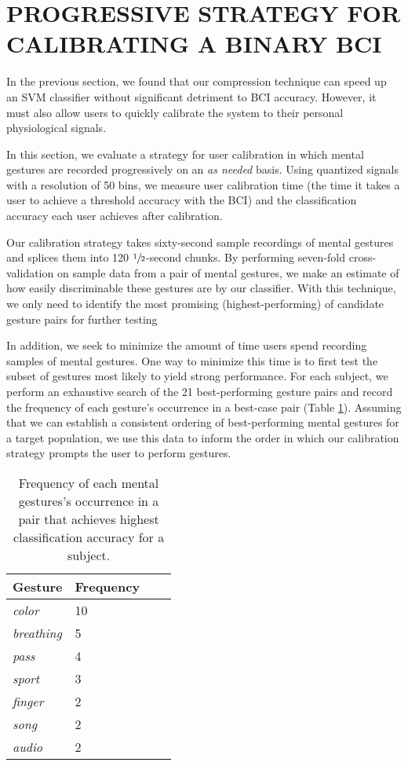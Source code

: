 \section{\uppercase{Progressive strategy for calibrating a binary BCI}}
\label{sec:calibration_eval}

\noindent In the previous section, we found that our compression technique can speed up an SVM classifier without significant detriment to BCI accuracy. However, it must also allow users to quickly calibrate the system to their personal physiological signals.

In this section, we evaluate a strategy for user calibration in which mental gestures are recorded progressively on an \textit{as needed} basis. Using  quantized signals with a resolution of 50 bins, we measure user calibration time (the time it takes a user to achieve a threshold accuracy with the BCI) and the classification accuracy each user achieves after calibration. 

Our calibration strategy takes sixty-second sample recordings of mental gestures and splices them into 120 $\sfrac{1}{2}$-second chunks. By performing seven-fold cross-validation on sample data from a pair of mental gestures, we make an estimate of how easily discriminable these gestures are by our classifier. With this technique, we only need to identify the most promising (highest-performing) of candidate gesture pairs for further testing

In addition, we seek to minimize the amount of time users spend recording samples of mental gestures. One way to minimize this time is to first test the subset of gestures most likely to yield strong performance. For each subject, we perform an exhaustive search of the 21 best-performing gesture pairs and record the frequency of each gesture's occurrence in a best-case pair (Table \ref{table:name}). Assuming that we can establish a consistent ordering of best-performing mental gestures for a target population, we use this data to inform the order in which our calibration strategy prompts the user to perform gestures.


\begin{table}[!h]
  \centering
  \begin{tabular}{ | l | l | l | p{5cm} |}
  \hline
  Gesture & Frequency \\ \hline
  \textit{color} & 10 \\ \hline
  \textit{breathing} & 5 \\ \hline
  \textit{pass} & 4 \\ \hline
  \textit{sport} & 3 \\ \hline
  \textit{finger} & 2 \\ \hline
  \textit{song} & 2 \\ \hline
  \textit{audio} & 2 \\ \hline
  \end{tabular}
  \caption{Frequency of each mental gestures's occurrence in a pair that achieves highest classification accuracy for a subject.}
  \label{table:name}
\end{table}

